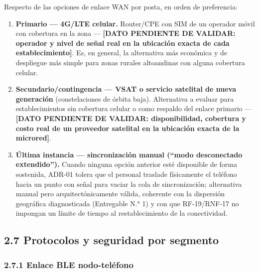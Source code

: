 \documentclass[11pt,a4paper]{article}
\providecommand{\tightlist}{%
  \setlength{\itemsep}{0pt}\setlength{\parskip}{0pt}}
\begin{document}
Respecto de las opciones de enlace WAN por posta, en orden de preferencia:

\begin{enumerate}
\def\labelenumi{\arabic{enumi}.}
\tightlist
\item
  \textbf{Primario --- 4G/LTE celular.} Router/CPE con SIM de un operador móvil con cobertura en la zona --- \textbf{{[}DATO PENDIENTE DE VALIDAR: operador y nivel de señal real en la ubicación exacta de cada establecimiento{]}}. Es, en general, la alternativa más económica y de despliegue más simple para zonas rurales altoandinas con alguna cobertura celular.
\item
  \textbf{Secundario/contingencia --- VSAT o servicio satelital de nueva generación} (constelaciones de órbita baja). Alternativa a evaluar para establecimientos sin cobertura celular o como respaldo del enlace primario --- \textbf{{[}DATO PENDIENTE DE VALIDAR: disponibilidad, cobertura y costo real de un proveedor satelital en la ubicación exacta de la microred{]}}.
\item
  \textbf{Última instancia --- sincronización manual (``modo desconectado extendido'').} Cuando ninguna opción anterior esté disponible de forma sostenida, ADR-01 tolera que el personal traslade físicamente el teléfono hacia un punto con señal para vaciar la cola de sincronización; alternativa manual pero arquitectónicamente válida, coherente con la dispersión geográfica diagnosticada (Entregable N.° 1) y con que RF-19/RNF-17 no impongan un límite de tiempo al restablecimiento de la conectividad.
\end{enumerate}

\subsection{2.7 Protocolos y seguridad por segmento}\label{protocolos-y-seguridad-por-segmento}

\subsubsection{2.7.1 Enlace BLE nodo-teléfono}\label{enlace-ble-nodo-teluxe9fono}
\end{document}
